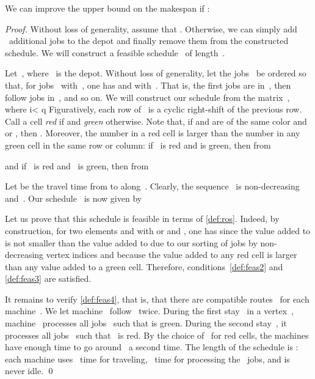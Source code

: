 \documentclass[natbib,sort,smallextended,envcountsame,envcountsect,numbook]{svjour3}
\newcommand{\ROSUPT}{\textsc{ROS-UET}}
\begin{document}
\noindent
We can improve the upper bound
on the makespan
if :
\begin{proof}
  Without loss of generality, assume that .  Otherwise, we
  can simply add
  ~additional jobs to the depot and finally remove them from the
  constructed schedule.  We will construct a feasible schedule~
  of length~.

  Let~,
  where ~is the depot.
  Without loss of generality,
  let the jobs~ be ordered so that,
  for jobs~ with~, one has 
  and  with~.
  That is, the first jobs are in~,
  then follow jobs in~, and so on.  
  We will construct our schedule from the
  matrix~, where
  i< q
  Figuratively, each row of~ is a cyclic right-shift of the previous row.
Call a cell  \textit{red} if  and \textit{green} otherwise. Note that, if  and  are of the same color and  or , then . Moreover, the number in a red cell is larger than the number in any green cell in the same row or column: if ~is red and  is green, then from
 
and if ~is red and ~is green, then from

Let  be the travel time from  to  along~.  Clearly, the sequence~ is non-decreasing and~.  Our schedule~ is now given by

Let us prove that this schedule is feasible in terms of \cref{def:ros}. Indeed, by construction, for two elements  and  with  or  and , one has  since the value added to  is not smaller than the value added to  due to our sorting of jobs by non-decreasing vertex indices and because the value added to any red cell is larger than any value added to a green cell.  Therefore, conditions~\eqref{def:feas2} and \eqref{def:feas3} are satisfied.

It remains to verify \eqref{def:feas4}, that is,
that there are compatible routes~
for each machine~.
We let machine~ follow~ twice.
During the first stay~ in a vertex~,
machine~ processes all jobs~
such that  is green.
During the second stay~,
it processes all jobs~
such that ~is red.
By the choice of~ for red cells, the machines have enough time to go around~ a second time. 
The length of the schedule is :
each machine uses ~time for traveling,
~time for processing the ~jobs,
and is never idle.
\qed\end{proof}
\end{document}
